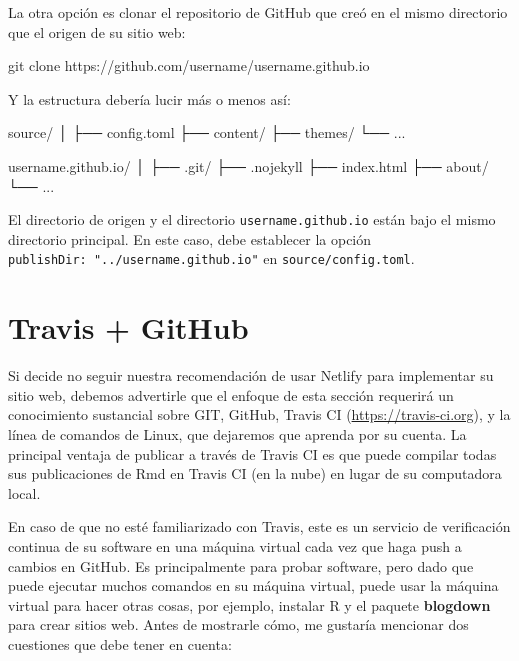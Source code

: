 \documentclass[12pt,]{krantz}
\makeatletter
\newenvironment{Shaded}{\begin{snugshade}}{\end{snugshade}}
\newcommand{\ExtensionTok}[1]{#1}
\newcommand{\FunctionTok}[1]{\textcolor[rgb]{0.00,0.00,0.00}{#1}}
\newcommand{\NormalTok}[1]{#1}
\newenvironment{kframe}{%
\medskip{}
\setlength{\fboxsep}{.8em}
 \def\at@end@of@kframe{}%
 \ifinner\ifhmode%
  \def\at@end@of@kframe{\end{minipage}}%
  \begin{minipage}{\columnwidth}%
 \fi\fi%
 \def\FrameCommand##1{\hskip\@totalleftmargin \hskip-\fboxsep
 \colorbox{shadecolor}{##1}\hskip-\fboxsep
     \hskip-\linewidth \hskip-\@totalleftmargin \hskip\columnwidth}%
 \MakeFramed {\advance\hsize-\width
   \@totalleftmargin\z@ \linewidth\hsize
   \@setminipage}}%
 {\par\unskip\endMakeFramed%
 \at@end@of@kframe}
\renewenvironment{Shaded}{\begin{kframe}}{\end{kframe}}
\theoremstyle{definition}
\theoremstyle{definition}
\theoremstyle{definition}
\theoremstyle{remark}
\makeatother
\begin{document}
La otra opción es clonar el repositorio de GitHub que creó en el mismo
directorio que el origen de su sitio web:

\begin{Shaded}
\begin{Highlighting}[]
\FunctionTok{git}\NormalTok{ clone https://github.com/username/username.github.io}
\end{Highlighting}
\end{Shaded}

Y la estructura debería lucir más o menos así:

\begin{Shaded}
\begin{Highlighting}[]
\ExtensionTok{source/}
\NormalTok{│}
\NormalTok{├── }\ExtensionTok{config.toml}
\NormalTok{├── }\ExtensionTok{content/}
\NormalTok{├── }\ExtensionTok{themes/}
\NormalTok{└── }\ExtensionTok{...}

\ExtensionTok{username.github.io/}
\NormalTok{│}
\NormalTok{├── }\ExtensionTok{.git/}
\NormalTok{├── }\ExtensionTok{.nojekyll}
\NormalTok{├── }\ExtensionTok{index.html}
\NormalTok{├── }\ExtensionTok{about/}
\NormalTok{└── }\ExtensionTok{...}
\end{Highlighting}
\end{Shaded}

El directorio de origen y el directorio \texttt{username.github.io}
están bajo el mismo directorio principal. En este caso, debe establecer
la opción \texttt{publishDir:\ "../username.github.io"} en
\texttt{source/config.toml}.

\hypertarget{travis-github}{%
\section{Travis + GitHub}\label{travis-github}}

Si decide no seguir nuestra recomendación de usar
Netlify para implementar su sitio web, debemos advertirle que el enfoque
de esta sección requerirá un conocimiento sustancial sobre GIT, GitHub,
Travis CI (\url{https://travis-ci.org}), y la línea de comandos de
Linux, que dejaremos que aprenda por su cuenta. La principal ventaja de
publicar a través de Travis CI es que puede compilar todas sus
publicaciones de Rmd en Travis CI (en la nube) en lugar de su
computadora local.

En caso de que no esté familiarizado con Travis, este es un servicio de
verificación continua de su software en una máquina virtual cada vez que
haga push a cambios en GitHub. Es principalmente para probar software,
pero dado que puede ejecutar muchos comandos en su máquina virtual,
puede usar la máquina virtual para hacer otras cosas, por ejemplo,
instalar R y el paquete \textbf{blogdown} para crear sitios web. Antes
de mostrarle cómo, me gustaría mencionar dos cuestiones que debe tener
en cuenta:
\end{document}
